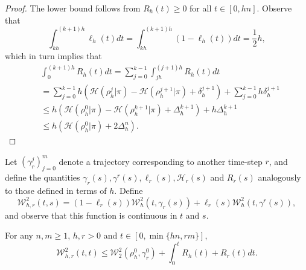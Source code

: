 \documentclass[final,12pt]{colt2018}
\newcommand{\was}{\mathcal{W}}
\begin{document}
\begin{proof}
The lower bound follows from $R_{h}(t) \geq 0$ for all $t\in[0,hn]$. Observe that
\begin{equation}
\int_{kh}^{(k+1)h} \ell_{h}(t) dt = \int_{kh}^{(k+1)h} (1 - \ell_{h}(t)) dt = \frac{1}{2}h,
\end{equation}
which in turn implies that
\begin{align}
&\int_0^{(k+1)h}R_{h}(t) dt  = \sum_{j=0}^{k-1} \int_{jh}^{(j+1)h}R_{h}(t) dt \\
& = \sum_{j=0}^{k-1}  h \left(\mathcal{H}(\rho_{h}^{j}| \pi) - \mathcal{H}(\rho_{h}^{j+1} | \pi) + \delta_{h}^{j+1}\right) + \sum_{j=0}^{k-1}  h\delta_{h}^{j+1} \\
&\leq h\left(\mathcal{H}(\rho_{h}^{0} | \pi) - \mathcal{H}(\rho_{h}^{k+1} | \pi) + \Delta_{h}^{k+1}\right) + h \Delta_{h}^{k+1}\\
&\leq h\left(\mathcal{H}(\rho_{h}^{0} | \pi) + 2\Delta_{h}^{n}\right).
\end{align}
\end{proof}

Let $(\gamma_{r}^{j})_{j=0}^m$ denote a trajectory corresponding to another time-step ${r}$, and define the quantities $\gamma_{r}(s), \gamma^{r}(s), \ell_{r}(s), \mathcal{H}_{r}(s)$ and $R_{r}(s)$ analogously to those defined in terms of $h$. Define
\begin{equation}
\was^2_{h, r}(t,s) = (1- \ell_{r}(s))\was^2_{h}(t, \gamma_{r}(s)) + \ell_{r}(s)\was^2_{h}(t, \gamma^{r}(s)),
\end{equation}
and observe that this function is continuous in $t$ and $s$. 

\begin{lemma}\label{lemma:bound_function_with_integral}
For any $n, m \geq 1$, $h, r >0$ and $t \in [0,\min\{hn,rm\}]$,
\begin{equation}
\was^2_{h, r}(t,t) \leq \was_2^2(\rho_{h}^0, \gamma_{r}^0) +  \int_0^t R_{h}(t) +  R_{r}(t) dt.
\end{equation}
\end{lemma}
\end{document}
